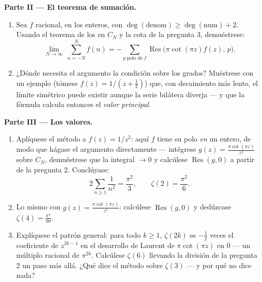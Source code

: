 \begin{problem}
\medskip
\noindent\textbf{Parte II --- El teorema de sumación.}
\begin{enumerate}[resume]
  \item Sea $f$ racional,  en
  los enteros, con $\deg(\text{denom}) \geq \deg(\text{num}) + 2$.
  Usando el teorema de los
   en $C_N$ y la cota de
  la pregunta 3, demuéstrese:
        \[
        \lim_{N\to\infty}\ \sum_{n = -N}^{N} f(n)
        = -\sum_{p\ \text{polo de}\ f}
        \operatorname{Res}\bigl(\pi\cot(\pi z)f(z),\,p\bigr).
        \]
  \item ¿Dónde necesita el argumento la condición sobre los grados?
  Muéstrese con un ejemplo (tómese $f(z) = 1/(z + \frac12)$) que, con
  decaimiento más lento, el límite simétrico puede existir aunque la
  serie bilátera diverja --- y que la fórmula calcula entonces el
  \emph{valor principal}.
\end{enumerate}

\medskip
\noindent\textbf{Parte III --- Los valores.}
\begin{enumerate}[resume]
  \item Aplíquese el método a $f(z) = 1/z^2$: aquí $f$ tiene su polo
  \emph{en} un entero, de modo que hágase el argumento directamente ---
  intégrese $g(z) = \frac{\pi\cot(\pi
        z)}{z^2}$ sobre $C_N$, demuéstrese que la integral $\to 0$ y
  calcúlese $\operatorname{Res}(g, 0)$ a partir de la pregunta 2.
  Conclúyase:
        \[
        2\sum_{n\geq1}\frac1{n^2} = \frac{\pi^2}{3},
        \qquad \zeta(2) = \frac{\pi^2}6 .
        \]
  \item Lo mismo con $g(z) = \frac{\pi\cot(\pi z)}{z^4}$: calcúlese
  $\operatorname{Res}(g, 0)$ y dedúzcase
        $\zeta(4) = \frac{\pi^4}{90}$.
  \item Explíquese el patrón general: para todo $k \geq 1$, $\zeta(2k)$
  es $-\frac12$ veces el coeficiente de $z^{2k-1}$ en el desarrollo de
  Laurent de $\pi\cot(\pi
        z)$ en $0$ --- un múltiplo racional de $\pi^{2k}$. Calcúlese
  $\zeta(6)$ llevando la división de la pregunta 2 un paso más allá.
  ¿Qué dice el método sobre $\zeta(3)$ --- y por qué no dice nada?
\end{enumerate}


\end{problem}
